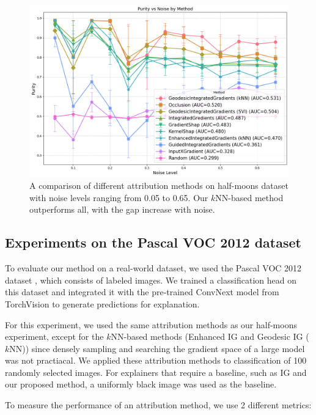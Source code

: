 \begin{figure}[b!]
	\begin{center}
		\centerline{\includegraphics[width=0.95\columnwidth]{figures/purity.png}}
		\caption{A comparison of different attribution methods on half-moons dataset with noise levels ranging from 0.05 to 0.65. Our $k$NN-based method outperforms all, with the gap increase with noise.}
		\label{fig:purity}
	\end{center}
	\vskip -0.3in
\end{figure}


\subsection{Experiments on the Pascal VOC 2012 dataset}
\label{subsec:voc}

To evaluate our method on a real-world dataset, we used the Pascal VOC 2012 dataset \citep{pascal-voc-2012}, which consists of labeled images. We trained a classification head on this dataset and integrated it with the pre-trained ConvNext model \citep{liu2022convnet} from TorchVision to generate predictions for explanation.

For this experiment, we used the same attribution methods as our half-moons experiment, except for the $k$NN-based methods (Enhanced IG and Geodesic IG ($k$NN)) since densely sampling and searching the gradient space of a large model was not practiacal. We applied these attribution methods to classification of 100 randomly selected images. For explainers that require a baseline, such as IG and our proposed method, a uniformly black image was used as the baseline.

To measure the performance of an attribution method, we use 2 different metrics:

